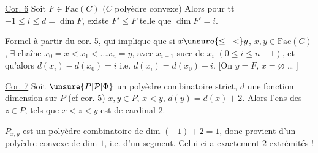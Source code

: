 \uline{Cor. 6} Soit $F\in\mathrm{Fac}(C)$ ($C$ polyèdre convexe)
Alors pour tt $-1\leq i\leq d=\dim F$, existe $F'\leq F$
telle que $\dim F'=i$.


Formel à partir du cor. 5, qui implique que
si $x\unsure{\leq|<} y$, $x,y\in\mathrm{Fac}(C)$,  $\exists$ chaîne
$x_0=x<x_1<\ldots x_n=y$, avec $x_{i+1}$ succ de $x_i$
$(0\leq i\leq n-1)$, et qu'alors 
 $d(x_i)-d(x_0)=i$ i.e. $d(x_i)=d(x_0)+i$.
[On  $y=F$, $x=\varnothing$ \ldots{} ]

\uline{Cor. 7} Soit $\unsure{P|\mathcal P|\Phi}$ un polyèdre combinatoire
strict, $d$ une fonction dimension sur $P$
(cf cor. 5)  $x,y\in P$, $x<y$,
$d(y)=d(x)+2$. Alors l'ens des $z\in P$,
tels que $x<z<y$ est de cardinal $2$.

$P_{x,y}$ est un polyèdre combinatoire  de
dim $(-1)+2=1$, donc provient d'un polyèdre
convexe de dim $1$, i.e. d'un segment. Celui-ci a exactement $2$ extrémités !
